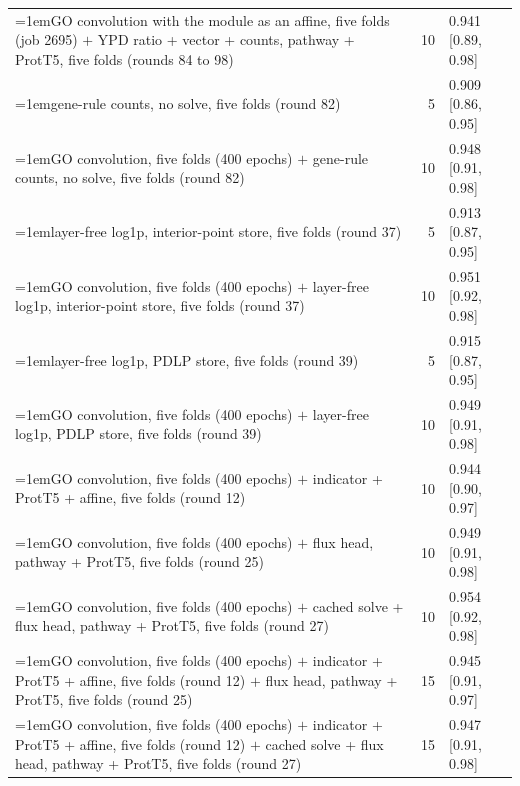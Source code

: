 \begin{table}[H]
\begin{tabular}{@{}>{\raggedright\hangindent=1em\hangafter=1\arraybackslash}p{147.5mm}rl@{}}
    GO convolution with the module as an affine, five folds (job 2695) $+$ YPD ratio + vector + counts, pathway + ProtT5, five folds (rounds 84 to 98) & 10 & 0.941 [0.89, 0.98] \\
    gene-rule counts, no solve, five folds (round 82) & 5 & 0.909 [0.86, 0.95] \\
    GO convolution, five folds (400 epochs) $+$ gene-rule counts, no solve, five folds (round 82) & 10 & 0.948 [0.91, 0.98] \\
    layer-free log1p, interior-point store, five folds (round 37) & 5 & 0.913 [0.87, 0.95] \\
    GO convolution, five folds (400 epochs) $+$ layer-free log1p, interior-point store, five folds (round 37) & 10 & 0.951 [0.92, 0.98] \\
    layer-free log1p, PDLP store, five folds (round 39) & 5 & 0.915 [0.87, 0.95] \\
    GO convolution, five folds (400 epochs) $+$ layer-free log1p, PDLP store, five folds (round 39) & 10 & 0.949 [0.91, 0.98] \\
    GO convolution, five folds (400 epochs) $+$ indicator + ProtT5 + affine, five folds (round 12) & 10 & 0.944 [0.90, 0.97] \\
    GO convolution, five folds (400 epochs) $+$ flux head, pathway + ProtT5, five folds (round 25) & 10 & 0.949 [0.91, 0.98] \\
    GO convolution, five folds (400 epochs) $+$ cached solve + flux head, pathway + ProtT5, five folds (round 27) & 10 & 0.954 [0.92, 0.98] \\
    GO convolution, five folds (400 epochs) $+$ indicator + ProtT5 + affine, five folds (round 12) $+$ flux head, pathway + ProtT5, five folds (round 25) & 15 & 0.945 [0.91, 0.97] \\
    GO convolution, five folds (400 epochs) $+$ indicator + ProtT5 + affine, five folds (round 12) $+$ cached solve + flux head, pathway + ProtT5, five folds (round 27) & 15 & 0.947 [0.91, 0.98] \\
    \hline
  \end{tabular}
\end{table}

